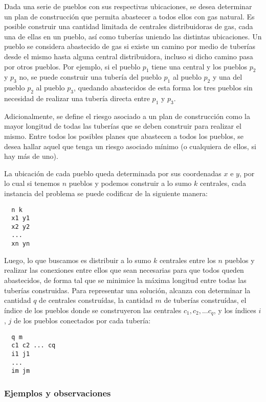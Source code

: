 Dada una serie de pueblos con sus respectivas ubicaciones, se desea determinar un plan de construcción que permita abastecer a todos ellos con gas natural. Es posible construir una cantidad limitada de centrales distribuidoras de gas, cada una de ellas en un pueblo, así como tuberías uniendo las distintas ubicaciones. Un pueblo se considera abastecido de gas si existe un camino por medio de tuberías desde el mismo hasta alguna central distribuidora, incluso si dicho camino pasa por otros pueblos. Por ejemplo, si el pueblo $p_1$ tiene una central y los pueblos $p_2$ y $p_3$ no, se puede construir una tubería del pueblo $p_1$ al pueblo $p_2$ y una del pueblo $p_2$ al pueblo $p_3$, quedando abastecidos de esta forma los tres pueblos sin necesidad de realizar una tubería directa entre $p_1$ y $p_3$.

Adicionalmente, se define el riesgo asociado a un plan de construcción como la mayor longitud de todas las tuberías que se deben construir para realizar el mismo. Entre todos los posibles planes que abastecen a todos los pueblos, se desea hallar aquel que tenga un riesgo asociado mínimo (o cualquiera de ellos, si hay más de uno).

La ubicación de cada pueblo queda determinada por sus coordenadas $x$ e $y$, por lo cual si tenemos $n$ pueblos y podemos construir a lo sumo $k$ centrales, cada instancia del problema se puede codificar de la siguiente manera:

\begin{verbatim}
  n k
  x1 y1
  x2 y2
  ...
  xn yn
\end{verbatim}

Luego, lo que buscamos es distribuir a lo sumo $k$ centrales entre los $n$ pueblos y realizar las conexiones entre ellos que sean necesarias para que todos queden abastecidos, de forma tal que se minimice la máxima longitud entre todas las tuberías construidas. Para representar una solución, alcanza con determinar la cantidad $q$ de centrales construídas, la cantidad $m$ de tuberías construídas, el índice de los pueblos donde se construyeron las centrales $c_1, c_2, ... c_q$, y los índices $i$, $j$ de los pueblos conectados por cada tubería:

\begin{verbatim}
  q m
  c1 c2 ... cq
  i1 j1
  ...
  im jm
\end{verbatim}

\subsubsection{Ejemplos y observaciones}

